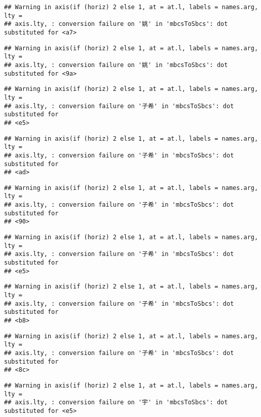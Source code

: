 \documentclass[
]{article}
\begin{document}
\begin{verbatim}
## Warning in axis(if (horiz) 2 else 1, at = at.l, labels = names.arg, lty =
## axis.lty, : conversion failure on '姚' in 'mbcsToSbcs': dot substituted for <a7>
\end{verbatim}

\begin{verbatim}
## Warning in axis(if (horiz) 2 else 1, at = at.l, labels = names.arg, lty =
## axis.lty, : conversion failure on '姚' in 'mbcsToSbcs': dot substituted for <9a>
\end{verbatim}

\begin{verbatim}
## Warning in axis(if (horiz) 2 else 1, at = at.l, labels = names.arg, lty =
## axis.lty, : conversion failure on '子希' in 'mbcsToSbcs': dot substituted for
## <e5>
\end{verbatim}

\begin{verbatim}
## Warning in axis(if (horiz) 2 else 1, at = at.l, labels = names.arg, lty =
## axis.lty, : conversion failure on '子希' in 'mbcsToSbcs': dot substituted for
## <ad>
\end{verbatim}

\begin{verbatim}
## Warning in axis(if (horiz) 2 else 1, at = at.l, labels = names.arg, lty =
## axis.lty, : conversion failure on '子希' in 'mbcsToSbcs': dot substituted for
## <90>
\end{verbatim}

\begin{verbatim}
## Warning in axis(if (horiz) 2 else 1, at = at.l, labels = names.arg, lty =
## axis.lty, : conversion failure on '子希' in 'mbcsToSbcs': dot substituted for
## <e5>
\end{verbatim}

\begin{verbatim}
## Warning in axis(if (horiz) 2 else 1, at = at.l, labels = names.arg, lty =
## axis.lty, : conversion failure on '子希' in 'mbcsToSbcs': dot substituted for
## <b8>
\end{verbatim}

\begin{verbatim}
## Warning in axis(if (horiz) 2 else 1, at = at.l, labels = names.arg, lty =
## axis.lty, : conversion failure on '子希' in 'mbcsToSbcs': dot substituted for
## <8c>
\end{verbatim}

\begin{verbatim}
## Warning in axis(if (horiz) 2 else 1, at = at.l, labels = names.arg, lty =
## axis.lty, : conversion failure on '宇' in 'mbcsToSbcs': dot substituted for <e5>
\end{verbatim}
\end{document}
